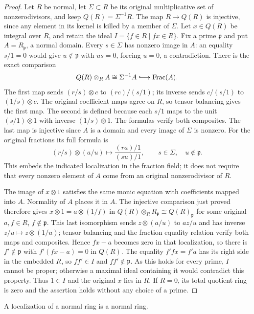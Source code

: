 \begin{proof}
Let $R$ be normal, let $\Sigma\subset R$ be its original
multiplicative set of nonzerodivisors, and keep
$Q(R)=\Sigma^{-1}R$. The map $R\to Q(R)$ is injective,
since any element in its kernel is killed by a member of $\Sigma$.
Let $x\in Q(R)$ be integral over $R$, and retain the ideal
$I=\{f\in R\mid fx\in R\}$.
Fix a prime $\mathfrak p$ and put $A=R_{\mathfrak p}$, a
normal domain. Every $s\in\Sigma$ has nonzero image in $A$:
an equality $s/1=0$ would give $u\notin\mathfrak p$ with
$us=0$, forcing $u=0$, a contradiction.
There is the exact comparison
$$
Q(R)\otimes_RA\cong\Sigma^{-1}A
\lhook\joinrel\longrightarrow\operatorname{Frac}(A).
$$
The first map sends $(r/s)\otimes c$ to $(rc)/(s/1)$;
its inverse sends $c/(s/1)$ to $(1/s)\otimes c$.
The original coefficient maps agree on $R$, so tensor balancing
gives the first map. The second is defined because each $s/1$
maps to the unit $(s/1)\otimes1$ with inverse $(1/s)\otimes1$.
The formulas verify both composites. The last map is injective
since $A$ is a domain and every image of $\Sigma$ is nonzero.
For the original fractions its full formula is
$$
(r/s)\otimes(a/u)\longmapsto
\frac{(ra)/1}{(su)/1},\qquad
s\in\Sigma,\quad u\notin\mathfrak p.
$$
This embeds the indicated localization in the fraction field;
it does not require that every nonzero element of $A$ come from
an original nonzerodivisor of $R$.

The image of $x\otimes1$ satisfies the same monic equation
with coefficients mapped into $A$. Normality of $A$ places
it in $A$. The injective comparison just proved therefore gives
$x\otimes1=a\otimes(1/f)$ in
$Q(R)\otimes_RR_{\mathfrak p}\cong Q(R)_{\mathfrak p}$ for
some original $a,f\in R$, $f\notin\mathfrak p$.
This last isomorphism sends $z\otimes(a/u)$ to $az/u$
and has inverse $z/u\mapsto z\otimes(1/u)$; tensor balancing
and the fraction equality relation verify both maps and composites.
Hence $fx-a$ becomes zero in that localization, so there is
$f'\notin\mathfrak p$ with $f'(fx-a)=0$ in $Q(R)$.
The equality $f'fx=f'a$ has its right side in the embedded $R$,
so $ff'\in I$ and $ff'\notin\mathfrak p$.
As this holds for every prime, $I$ cannot be proper; otherwise
a maximal ideal containing it would contradict this property.
Thus $1\in I$ and the original $x$ lies in $R$.
If $R=0$, its total quotient ring is zero and the assertion
holds without any choice of a prime.
\end{proof}

\begin{lemma}
\label{editorial-source-lemma-localization-normal-ring}
A localization of a normal ring is a normal ring.
\end{lemma}

